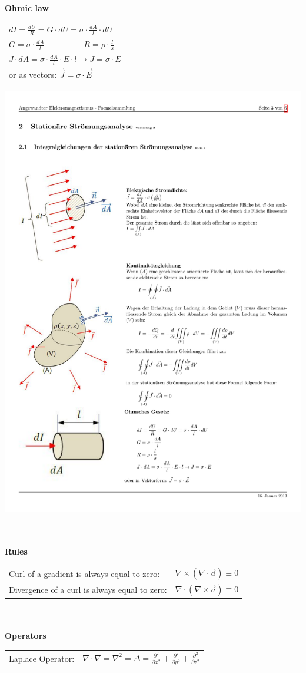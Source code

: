 \textbf{\\ Ohmic law\\}
\begin{minipage}[lt]{11cm}
	\begin{tabular}{l}
		\(\displaystyle dI = \frac{dU}{R} = G \cdot dU = \sigma \cdot \frac{dA}{l} \cdot dU \) \\
		\(\displaystyle G = \sigma \cdot \frac{dA}{l} \hspace{2cm} R = \rho \cdot \frac{l}{s} \) \\
		\(\displaystyle J \cdot dA = \sigma \cdot \frac{dA}{l} \cdot E \cdot l \rightarrow J = \sigma \cdot E \) \\
		or as vectors: \(\displaystyle \vec{J} = \sigma \cdot \vec{E}\)
	\end{tabular}
\end{minipage}
\begin{minipage}[rt]{8cm}
	\includegraphics[width=.5\textwidth]{./images/ohmic.pdf}
\end{minipage}


\textbf{\\ \\ Rules \\}
\begin{tabular}{ll}
	Curl of a gradient is always equal to zero: & \(\displaystyle \nabla \times \left(\nabla \cdot \vec{a} \right) \equiv 0\) \\
	Divergence of a curl is always equal to zero: & \(\displaystyle \nabla \cdot \left(\nabla \times \vec{a}\right) \equiv 0 \)\\
\end{tabular}

\textbf{\\ \\ Operators \\} 
\begin{tabular}{ll}
	Laplace Operator: & \(\displaystyle \nabla \cdot \nabla = \nabla^2 = \Delta = \frac{\partial^2}{\partial x^2}+\frac{\partial^2}{\partial y^2}+\frac{\partial^2}{\partial z^2} \) \\
\end{tabular}
